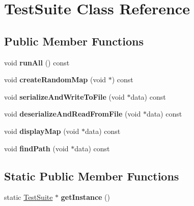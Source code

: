 \hypertarget{class_test_suite}{}\section{Test\+Suite Class Reference}
\label{class_test_suite}
\subsection*{Public Member Functions}
\begin{DoxyCompactItemize}
\item 
\hypertarget{class_test_suite_a3b8f6d54ac9ca5a7c178df1060f15c33}{}void {\bfseries run\+All} () const \label{class_test_suite_a3b8f6d54ac9ca5a7c178df1060f15c33}

\item 
\hypertarget{class_test_suite_a24a1af1b90087390bfb138bee98a3f47}{}void {\bfseries create\+Random\+Map} (void $\ast$) const \label{class_test_suite_a24a1af1b90087390bfb138bee98a3f47}

\item 
\hypertarget{class_test_suite_ad0a1dbcfab5b808402308d3a135d3d02}{}void {\bfseries serialize\+And\+Write\+To\+File} (void $\ast$data) const \label{class_test_suite_ad0a1dbcfab5b808402308d3a135d3d02}

\item 
\hypertarget{class_test_suite_a33ceb796df58bbbd43a76451a4526582}{}void {\bfseries deserialize\+And\+Read\+From\+File} (void $\ast$data) const \label{class_test_suite_a33ceb796df58bbbd43a76451a4526582}

\item 
\hypertarget{class_test_suite_acede5c53075b465b11369dae086fa024}{}void {\bfseries display\+Map} (void $\ast$data) const \label{class_test_suite_acede5c53075b465b11369dae086fa024}

\item 
\hypertarget{class_test_suite_a745113aade46247f436a8cd4b5a4fa12}{}void {\bfseries find\+Path} (void $\ast$data) const \label{class_test_suite_a745113aade46247f436a8cd4b5a4fa12}

\end{DoxyCompactItemize}
\subsection*{Static Public Member Functions}
\begin{DoxyCompactItemize}
\item 
\hypertarget{class_test_suite_ae244837d1f71daa087db38135435b9c1}{}static \hyperlink{class_test_suite}{Test\+Suite} $\ast$ {\bfseries get\+Instance} ()\label{class_test_suite_ae244837d1f71daa087db38135435b9c1}

\end{DoxyCompactItemize}
